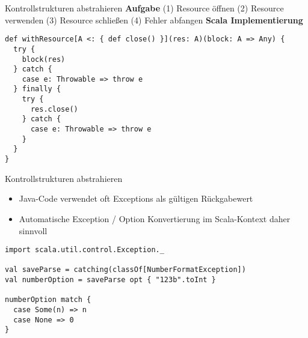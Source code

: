 \begin{frame}[fragile]{Kontrollstrukturen abstrahieren}
\center \textbf{Aufgabe} \linebreak	
(1) Resource öffnen (2) Resource verwenden \linebreak (3) Resource schließen (4) Fehler abfangen
\center \textbf{Scala Implementierung}
\begin{lstlisting}
def withResource[A <: { def close() }](res: A)(block: A => Any) {
  try {
    block(res)
  } catch {
    case e: Throwable => throw e
  } finally {
    try {
      res.close()
    } catch {
      case e: Throwable => throw e
    }
  }
}
\end{lstlisting}
\end{frame}  


\begin{frame}[fragile]{Kontrollstrukturen abstrahieren}
\begin{itemize}
	\item Java-Code verwendet oft Exceptions als gültigen Rückgabewert
	\item Automatische Exception / Option Konvertierung im Scala-Kontext daher sinnvoll
\end{itemize}
\begin{lstlisting}
import scala.util.control.Exception._

val saveParse = catching(classOf[NumberFormatException])
val numberOption = saveParse opt { "123b".toInt }   

numberOption match {
  case Some(n) => n
  case None => 0
}
\end{lstlisting}
\end{frame}  
